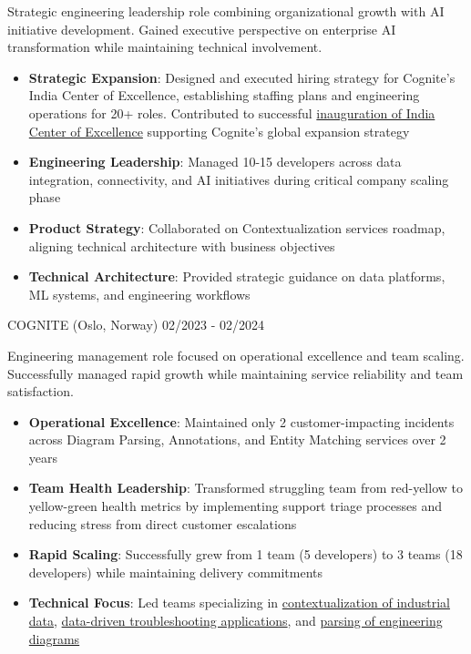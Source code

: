 \documentclass[singlesided,
               paper=a4,
               fontsize=10pt
              ]{my-resume}
\begin{document}
    {
        Strategic engineering leadership role combining organizational growth with AI initiative development. Gained executive perspective on enterprise AI transformation while maintaining technical involvement.

        \begin{itemize}[leftmargin=2em]
            \item \textbf{Strategic Expansion}: Designed and executed hiring strategy for Cognite's India Center of Excellence, establishing staffing plans and engineering operations for 20+ roles. Contributed to successful \href{https://www.cognite.com/en/company/newsroom/cognite-inaugurates-india-center-of-excellence-in-bengaluru-with-commitment-to-leveraging-ai-for-industrial-growth}{inauguration of India Center of Excellence} supporting Cognite's global expansion strategy
            \item \textbf{Engineering Leadership}: Managed 10-15 developers across data integration, connectivity, and AI initiatives during critical company scaling phase
            \item \textbf{Product Strategy}: Collaborated on Contextualization services roadmap, aligning technical architecture with business objectives
            \item \textbf{Technical Architecture}: Provided strategic guidance on data platforms, ML systems, and engineering workflows
        \end{itemize}
    }
%
	{COGNITE (Oslo, Norway)}
	{02/2023 - 02/2024}
    {
        Engineering management role focused on operational excellence and team scaling. Successfully managed rapid growth while maintaining service reliability and team satisfaction.

        \begin{itemize}[leftmargin=2em]
            \item \textbf{Operational Excellence}: Maintained only 2 customer-impacting incidents across Diagram Parsing, Annotations, and Entity Matching services over 2 years
            \item \textbf{Team Health Leadership}: Transformed struggling team from red-yellow to yellow-green health metrics by implementing support triage processes and reducing stress from direct customer escalations
            \item \textbf{Rapid Scaling}: Successfully grew from 1 team (5 developers) to 3 teams (18 developers) while maintaining delivery commitments
            \item \textbf{Technical Focus}: Led teams specializing in \href{https://www.cognite.com/en/contextualization}{contextualization of industrial data}, \href{https://www.cognite.com/en/industrial-canvas}{data-driven troubleshooting applications}, and \href{https://docs.cognite.com/cdf/integration/guides/contextualization/interactive_diagrams/}{parsing of engineering diagrams}
        \end{itemize}
    }
\end{document}
